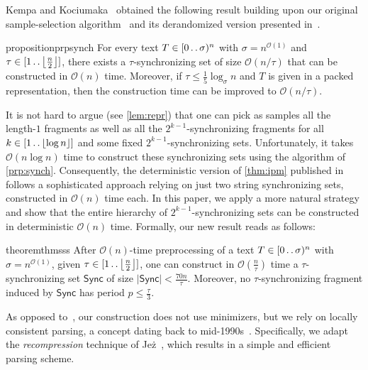 \documentclass[a4paper]{article}
\theoremstyle{definition}
\theoremstyle{remark}
\newcommand{\floor}[1]{\left\lfloor #1 \right\rfloor}
\newcommand{\dd}{\mathinner{\ldotp\ldotp}}
\newcommand{\Oh}{\mathcal{O}}
\renewcommand{\S}{\mathsf{Sync}}
\renewcommand{\S}{\mathsf{Sync}}
\begin{document}
Kempa and Kociumaka~\cite{Kempa2019} obtained the following result building upon our original sample-selection algorithm~\cite{DBLP:conf/soda/KociumakaRRW15}
and its derandomized version presented in~\cite{phd}.
\begin{restatable}{proposition}{prpsynch}\label{prp:synch}
For every text $T \in [0\dd \sigma)^n$ with $\sigma=n^{\Oh(1)}$ and $\tau\in [1\dd \floor{\frac{n}{2}}]$, there exists a $\tau$-synchronizing set of size $\Oh(n/\tau)$ that can be constructed in $\Oh(n)$ time. Moreover, if $\tau \leq \frac15 \log_\sigma n$ and $T$ is given in a packed representation, then the construction time can be improved to $\Oh(n/\tau)$.
\end{restatable}
It is not hard to argue (see \cref{lem:repr}) that one can pick as samples all the length-$1$ fragments as 
well as all the $2^{k-1}$-synchronizing fragments for all $k\in [1\dd \floor{\log n}]$ and some fixed $2^{k-1}$-synchronizing sets.
Unfortunately, it takes $\Oh(n \log n)$ time to construct these synchronizing sets using the algorithm of \cref{prp:synch}.
Consequently, the deterministic version of \cref{thm:ipm} published in~\cite{phd} follows a sophisticated approach relying on just two string synchronizing sets, constructed in $\Oh(n)$ time each.
In this paper, we apply a more natural strategy and show that the entire hierarchy of  $2^{k-1}$-synchronizing sets
can be constructed in deterministic $\Oh(n)$ time. Formally, our new result reads as follows:

\begin{restatable}{theorem}{thmsss}\label{thm:sss}
  After $\Oh(n)$-time preprocessing of a text $T \in [0\dd \sigma)^n$ with $\sigma=n^{\Oh(1)}$,
  given $\tau\in [1\dd \floor{\frac{n}{2}}]$, one can construct
  in $\Oh(\frac{n}{\tau})$ time a $\tau$-synchronizing set $\S$ of size  $|\S|< \tfrac{70n}{\tau}$.
  Moreover, no $\tau$-synchronizing fragment induced by $\S$ has period $p\le \frac{\tau}{3}$.
\end{restatable}

As opposed to~\cite{Kempa2019}, our construction does not use minimizers, but we rely on 
locally consistent parsing, a concept dating back to mid-1990s~\cite{FirstConsistentParsing,SymmetryBreakingST,DBLP:conf/focs/SahinalpV96,DBLP:journals/algorithmica/MehlhornSU97}. Specifically, we adapt the \emph{recompression} technique of Jeż~\cite{DBLP:journals/talg/Jez15,DBLP:journals/jacm/Jez16},
which results in a simple and efficient parsing scheme.
\end{document}
